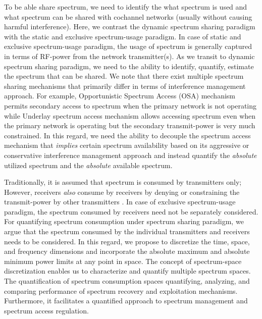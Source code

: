 \documentclass[journal,12pt,draftclsnofoot,onecolumn]{IEEEtran}
\newcommand{\mycomment}[1]{}
\begin{document}
To be able share spectrum, we need to identify the what spectrum is used and what spectrum can be shared with cochannel networks (usually without causing harmful interference). Here, we contrast the dynamic spectrum sharing paradigm with the static and exclusive spectrum-usage paradigm. In case of static and exclusive spectrum-usage paradigm, the usage of spectrum is generally captured in terms of RF-power from the network transmitter(s). As we transit to dynamic spectrum sharing paradigm, we need to the ability to identify, quantify, estimate the spectrum that can be shared. 
We note that there exist multiple spectrum sharing mechanisms that primarily differ in terms of interference management approach. For example, Opportunistic Spectrum Access (OSA) mechanism permits secondary access to spectrum when the primary network is not operating while Underlay spectrum access mechanism allows accessing spectrum even when the primary network is operating but the secondary transmit-power is very much constrained. In this regard, we need the ability to decouple the spectrum access mechanism that \textit{implies} certain spectrum availability based on its aggressive or conservative interference management approach and  instead quantify the \textit{absolute} utilized spectrum and the \textit{absolute} available spectrum.


Traditionally, it is assumed that spectrum is consumed by transmitters only; However, receivers \textit{also} consume by receivers by denying or constraining the transmit-power by other transmitters \cite{itu}. In case of exclusive spectrum-usage paradigm, the  spectrum consumed by receivers need not be separately considered. For quantifying spectrum consumption under spectrum sharing paradigm, we argue that the spectrum consumed by the individual transmitters and receivers needs to be considered. \mycomment{While the RF-power received from a transmitter decreases with increasing distance from the transmitter; the constraint imposed by a receiver on the tolerable interference power increases with increasing distance from the receiver. In order to \textit{quantify} the spectrum consumed by transmitters and receivers,} In this regard, we propose to discretize the time, space, and frequency dimensions and incorporate the absolute maximum and absolute minimum power limits at any point in space. The concept of spectrum-space discretization enables us to characterize and quantify multiple spectrum spaces. The quantification of spectrum consumption spaces quantifying, analyzing, and comparing performance of spectrum recovery and exploitation mechanisms. Furthermore, it facilitates a quantified approach to spectrum management and spectrum access regulation. 
  
\end{document}
